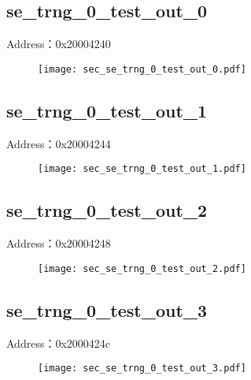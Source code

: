 \subsection{se\_trng\_0\_test\_out\_0}
\label{sec-se-trng-0-test-out-0}
Address：0x20004240
 \begin{figure}[H]
\texttt{[image: sec\_se\_trng\_0\_test\_out\_0.pdf]}
\end{figure}

\subsection{se\_trng\_0\_test\_out\_1}
\label{sec-se-trng-0-test-out-1}
Address：0x20004244
 \begin{figure}[H]
\texttt{[image: sec\_se\_trng\_0\_test\_out\_1.pdf]}
\end{figure}

\subsection{se\_trng\_0\_test\_out\_2}
\label{sec-se-trng-0-test-out-2}
Address：0x20004248
 \begin{figure}[H]
\texttt{[image: sec\_se\_trng\_0\_test\_out\_2.pdf]}
\end{figure}

\subsection{se\_trng\_0\_test\_out\_3}
\label{sec-se-trng-0-test-out-3}
Address：0x2000424c
 \begin{figure}[H]
\texttt{[image: sec\_se\_trng\_0\_test\_out\_3.pdf]}
\end{figure}

